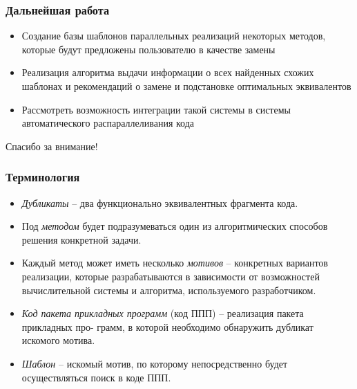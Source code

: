 \documentclass{beamer}
\begin{document}
\begin{frame}
\frametitle{Дальнейшая работа}
\begin{itemize}
	\item[\textbullet] Создание базы шаблонов параллельных реализаций некоторых методов, которые будут предложены пользователю в качестве замены 
	\item[\textbullet] Реализация алгоритма выдачи информации о всех найденных схожих шаблонах и рекомендаций о замене и подстановке оптимальных эквивалентов	
	\item[\textbullet] Рассмотреть возможность интеграции такой системы в системы автоматического распараллеливания кода
\end{itemize}
\end{frame}










\begin{frame}
\begin{center}
	Спасибо за внимание!
\end{center}
\end{frame}



\begin{frame}
\frametitle{Терминология}
\begin{itemize}
	\item \textit{Дубликаты} -- два функционально эквивалентных фрагмента кода.
	\item Под \textit{методом} будет подразумеваться один из алгоритмических способов решения конкретной задачи.
	\item Каждый метод может иметь несколько \textit{мотивов} – конкретных вариантов реализации, которые разрабатываются в зависимости от возможностей вычислительной системы и алгоритма, используемого разработчиком.
	\item \textit{Код пакета прикладных программ} (код ППП) – реализация пакета прикладных про-
грамм, в которой необходимо обнаружить дубликат искомого мотива.
	\item \textit{Шаблон} -- искомый мотив, по которому непосредственно будет осуществляться поиск в коде ППП.
\end{itemize}
\end{frame}
\end{document}
